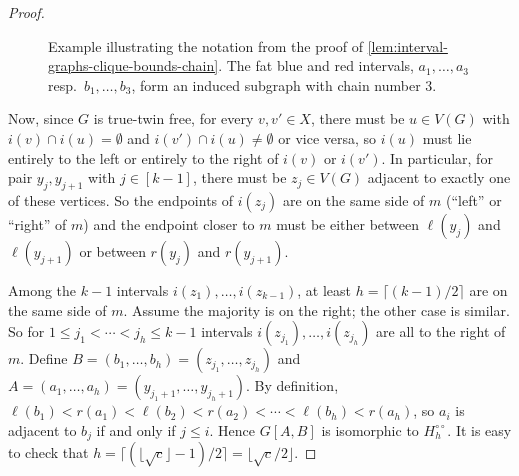 \documentclass{article}
\newcommand{\chainNum}{chain number\xspace}
\begin{document}
\begin{proof}
	\begin{figure}[tbhp]
		\centering
		\caption{%
			Example illustrating the notation from the proof of \cref{lem:interval-graphs-clique-bounds-chain}.
			The fat blue and red intervals, $a_1,\ldots,a_3$ resp.\ $b_1,\ldots,b_3$,
			form an induced subgraph with \chainNum 3.
		}
		\label{fig:interval-graphs-clique-bounds-chain}
	\end{figure}
	
	
	Now, since $G$ is true-twin free, for every $v,v'\in X$, there must be $u\in V(G)$ with
	$i(v)\cap i(u)=\emptyset$ and $i(v')\cap i(u)\ne \emptyset$ or vice versa, so
	$i(u)$ must lie entirely to the left or entirely to the right of $i(v)$ or $i(v')$.
	In particular, for pair $y_j,y_{j+1}$ with $j\in[k-1]$, there must be $z_j\in V(G)$
	adjacent to exactly one of these vertices. 
	So the endpoints of $i(z_j)$ are on the same side of $m$ (``left'' or ``right'' of $m$)
	and the endpoint closer to $m$ must be
	either between $\ell(y_j)$ and $\ell(y_{j+1})$
	or between $r(y_j)$ and $r(y_{j+1})$.
	
	
	Among the $k-1$ intervals $i(z_1),\ldots,i(z_{k-1})$, at least $h=\lceil(k-1)/2\rceil$
	are on the same side of $m$.
	Assume the majority is on the right; the other case is similar.
	So for $1\le j_1<\cdots<j_h \le k-1$ intervals $i(z_{j_1}),\ldots,i(z_{j_h})$ are all to the right of $m$.
	Define $B=(b_1,\ldots,b_h) = (z_{j_1},\ldots,z_{j_h})$
	and $A = (a_1,\ldots,a_h) = (y_{j_1+1},\ldots,y_{j_h+1})$.
	By definition, 
	$\ell(b_1)<r(a_1)<\ell(b_2)<r(a_2)<\cdots<\ell(b_h)<r(a_h)$,
	so $a_i$ is adjacent to $b_j$ if and only if $j \le i$.
	Hence $G[A,B]$ is isomorphic to $H^{\circ\circ}_h$.
	It is easy to check that 
	$h = \lceil (\lfloor\sqrt c\rfloor-1)/2\rceil = \lfloor \sqrt c/2\rfloor$.
\end{proof}
\end{document}
